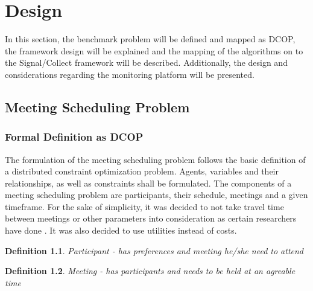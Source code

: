 \chapter{Design}

In this section, the benchmark problem will be defined and mapped as DCOP, the framework design will be explained and the mapping of the algorithms on to the Signal/Collect framework will be described. Additionally, the design and considerations regarding the monitoring platform will be presented.

\section{Meeting Scheduling Problem}

\subsection{Formal Definition as DCOP}

The formulation of the meeting scheduling problem follows the basic definition of a distributed constraint optimization problem. Agents, variables and their relationships, as well as constraints shall be formulated. The components of a meeting scheduling problem are participants, their schedule, meetings and a given timeframe. For the sake of simplicity, it was decided to not take travel time between meetings or other parameters into consideration as certain researchers have done \cite{Grubshtein}. It was also decided to use utilities instead of costs. %

\theoremstyle{hardconstraint2}
\newtheorem{hardconstraint2}{Definition}
\begin{hardconstraint2}
Participant - has preferences and meeting he/she need to attend
\end{hardconstraint2}
\begin{hardconstraint2}
Meeting - has participants and needs to be held at an agreable time
\end{hardconstraint2}

